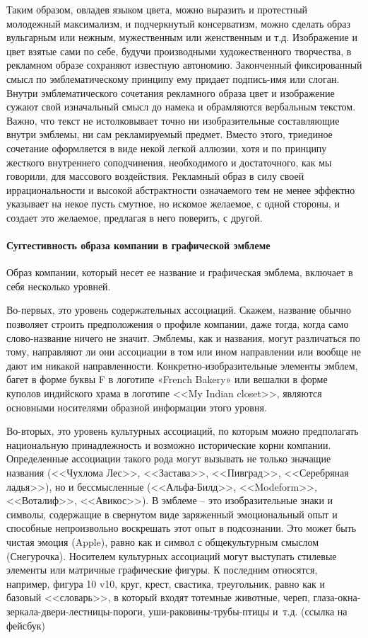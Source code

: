 Таким образом, овладев языком цвета, можно выразить и протестный молодежный
максимализм, и подчеркнутый консерватизм, можно сделать образ вульгарным или
нежным, мужественным или женственным и т.д. Изображение и цвет взятые сами по
себе, будучи производными художественного творчества, в рекламном образе
сохраняют известную автономию. Законченный фиксированный смысл по эмблематическому
принципу ему придает подпись-имя или слоган. Внутри эмблематического сочетания
рекламного образа цвет и изображение сужают свой изначальный смысл до намека и
обрамляются вербальным текстом. Важно, что текст не истолковывает точно ни
изобразительные составляющие внутри эмблемы, ни сам рекламируемый предмет.
Вместо этого, триединое сочетание оформляется в виде некой легкой аллюзии, хотя
и по принципу жесткого внутреннего соподчинения, необходимого и достаточного,
как мы говорили, для массового воздействия. Рекламный образ в силу своей
иррациональности и высокой абстрактности означаемого тем не менее эффектно
указывает на некое пусть смутное, но искомое желаемое, с одной стороны, и
создает это желаемое, предлагая в него поверить, с другой.

\paragraph{Суггестивность образа компании в  графической эмблеме}

Образ компании, который несет ее название и графическая эмблема, включает в
себя несколько уровней.

Во-первых, это уровень содержательных ассоциаций. Скажем, название обычно
позволяет строить предположения о профиле компании, даже тогда, когда само
слово-название ничего не значит. Эмблемы, как и названия, могут различаться по
тому, направляют ли они ассоциации в том или ином направлении или вообще не
дают им никакой направленности. Конкретно-изобразительные элементы эмблем,
багет в форме буквы F в логотипе «French Bakery» или вешалки в форме куполов
индийского храма в логотипе <<My Indian closet>>, являются основными носителями
образной информации этого уровня.

Во-вторых, это уровень культурных ассоциаций, по которым можно предполагать
национальную принадлежность и возможно  исторические корни компании. Определенные
ассоциации такого рода могут вызывать не только значащие
названия (<<Чухлома Лес>>, <<Застава>>, <<Пивград>>, <<Серебряная ладья>>), но
и бессмысленные (<<Альфа-Билд>>, <<Modeform>>, <<Воталиф>>, <<Авикос>>).
В эмблеме -- это изобразительные знаки и символы, содержащие в свернутом виде
заряженный эмоциональный опыт и способные непроизвольно воскрешать этот опыт
в подсознании. Это может быть чистая эмоция (Apple), равно как и символ с
общекультурным смыслом (Снегурочка). Носителем культурных ассоциаций могут
выступать стилевые элементы или матричные графические фигуры. К последним
относятся, например, фигура 10 v10, круг, крест, свастика, треугольник,
равно как и базовый <<словарь>>, в который входят тотемные животные, череп,
глаза-окна-зеркала-двери-лестницы-пороги, уши-раковины-трубы-птицы
и~т.д. (ссылка на фейсбук)

